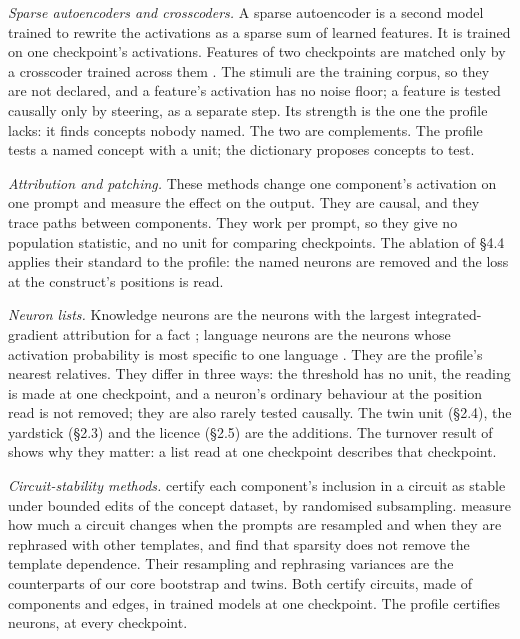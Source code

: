 \documentclass{article}
\begin{document}
\emph{Sparse autoencoders and crosscoders.} A sparse autoencoder is a second model trained to rewrite the activations as a sparse sum of learned features. It is trained on one checkpoint's activations. Features of two checkpoints are matched only by a crosscoder trained across them \citep{bayazit2026}. The stimuli are the training corpus, so they are not declared, and a feature's activation has no noise floor; a feature is tested causally only by steering, as a separate step. Its strength is the one the profile lacks: it finds concepts nobody named. The two are complements. The profile tests a named concept with a unit; the dictionary proposes concepts to test.

\emph{Attribution and patching.} These methods change one component's activation on one prompt and measure the effect on the output. They are causal, and they trace paths between components. They work per prompt, so they give no population statistic, and no unit for comparing checkpoints. The ablation of \S4.4 applies their standard to the profile: the named neurons are removed and the loss at the construct's positions is read.

\emph{Neuron lists.} Knowledge neurons are the neurons with the largest integrated-gradient attribution for a fact \citep{dai2022}; language neurons are the neurons whose activation probability is most specific to one language \citep{tang2024}. They are the profile's nearest relatives. They differ in three ways: the threshold has no unit, the reading is made at one checkpoint, and a neuron's ordinary behaviour at the position read is not removed; they are also rarely tested causally. The twin unit (\S2.4), the yardstick (\S2.3) and the licence (\S2.5) are the additions. The turnover result of \citet{wilam2026} shows why they matter: a list read at one checkpoint describes that checkpoint.

\emph{Circuit-stability methods.} \citet{anani2026} certify each component's inclusion in a circuit as stable under bounded edits of the concept dataset, by randomised subsampling. \citet{wu2026} measure how much a circuit changes when the prompts are resampled and when they are rephrased with other templates, and find that sparsity does not remove the template dependence. Their resampling and rephrasing variances are the counterparts of our core bootstrap and twins. Both certify circuits, made of components and edges, in trained models at one checkpoint. The profile certifies neurons, at every checkpoint.
\end{document}
